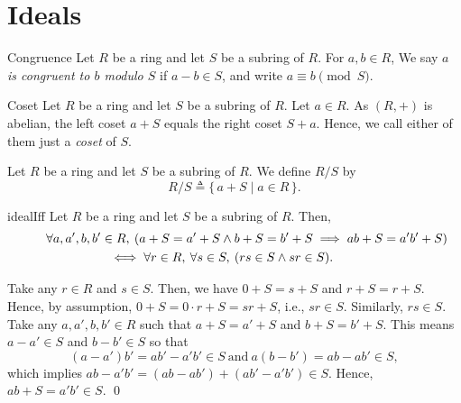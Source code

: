 \documentclass[../modern_algebra.tex]{subfiles}
\begin{document}
\section{Ideals}

\begin{Definition}[colbacktitle=red!75!black]{Congruence}{}
    Let \(R\) be a ring and let \(S\) be a subring of \(R\).
    For \(a, b \in R\),
    We say \textit{\(a\) is congruent to \(b\) modulo \(S\)}
    if \(a - b \in S\), and write \(a \equiv b \pmod{S}\).
\end{Definition}

\begin{Definition}[colbacktitle=red!75!black]{Coset}{}
    Let \(R\) be a ring and let \(S\) be a subring of \(R\).
    Let \(a \in R\).
    As \((R, +)\) is abelian, the left coset \(a + S\) equals the right coset \(S + a\).
    Hence, we call either of them just a \textit{coset} of \(S\).
\end{Definition}

\begin{Definition}[colbacktitle=red!75!black]{}{}
    Let \(R\) be a ring and let \(S\) be a subring of \(R\).
    We define \(R/S\) by
    \[
        R/S \triangleq \{\,a + S \mid a \in R\,\}.
    \]
\end{Definition}

\begin{Lemma}{\textsf{}}{idealIff}
    Let \(R\) be a ring and let \(S\) be a subring of \(R\). Then,
    \begin{multline*}
        \qquad\forall a, a', b, b' \in R,\: (a + S = a' + S \land b + S = b' + S \implies ab + S = a'b' + S) \\
        \iff \forall r \in R,\: \forall s \in S,\: (rs \in S \land sr \in S).\qquad
    \end{multline*}
\end{Lemma}
\begin{myclaim}[Proof]\hfill
\begin{itemize}[nolistsep, wide=0pt, widest={(\(\Rightarrow\))}, leftmargin=*, listparindent=\parindent]
    \ii[(\(\Rightarrow\))]
    Take any \(r \in R\) and \(s \in S\).
    Then, we have \(0 + S = s + S\) and \(r + S = r + S\).
    Hence, by assumption, \(0 + S = 0 \cdot r + S = sr + S\), i.e., \(sr \in S\).
    Similarly, \(rs \in S\).
    \ii[(\(\Leftarrow\))]
    Take any \(a, a', b, b' \in R\) such that \(a + S = a' + S\) and \(b + S = b' + S\).
    This means \(a - a' \in S\) and \(b - b' \in S\)
    so that
    \[
        (a - a')b' = ab' - a'b' \in S~\text{and}~a(b - b') = ab - ab' \in S,
    \]
    which implies \(ab - a'b' = (ab - ab') + (ab' - a'b') \in S\).
    Hence, \(ab + S = a'b' \in S\).
    \qed
\end{itemize}
\end{myclaim}
\end{document}
